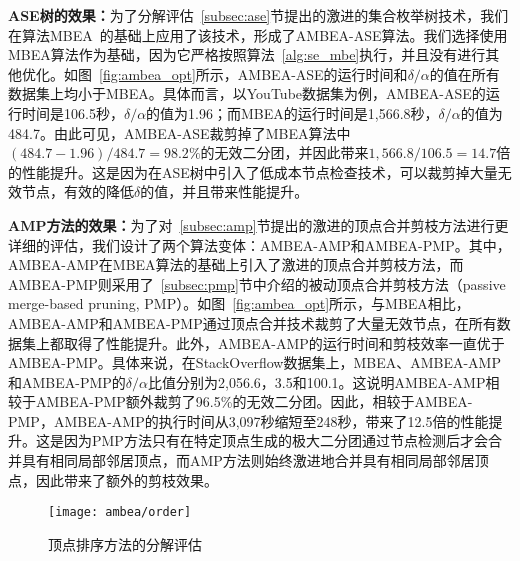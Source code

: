 

\textbf{ASE树的效果：}为了分解评估~\ref{subsec:ase}节提出的激进的集合枚举树技术，我们在算法MBEA~\cite{iMBEA14}的基础上应用了该技术，形成了AMBEA-ASE算法。我们选择使用MBEA算法作为基础，因为它严格按照算法~\ref{alg:se_mbe}执行，并且没有进行其他优化。如图~\ref{fig:ambea_opt}所示，AMBEA-ASE的运行时间和$\delta/\alpha$的值在所有数据集上均小于MBEA。具体而言，以YouTube数据集为例，AMBEA-ASE的运行时间是106.5秒，$\delta/\alpha$的值为1.96；而MBEA的运行时间是1,566.8秒，$\delta/\alpha$的值为484.7。由此可见，AMBEA-ASE裁剪掉了MBEA算法中$(484.7-1.96)/484.7=98.2\%$的无效二分团，并因此带来$1,566.8/106.5=14.7$倍的性能提升。这是因为在ASE树中引入了低成本节点检查技术，可以裁剪掉大量无效节点，有效的降低$\delta$的值，并且带来性能提升。

\textbf{AMP方法的效果：}为了对~\ref{subsec:amp}节提出的激进的顶点合并剪枝方法进行更详细的评估，我们设计了两个算法变体：AMBEA-AMP和AMBEA-PMP。其中，AMBEA-AMP在MBEA算法的基础上引入了激进的顶点合并剪枝方法，而AMBEA-PMP则采用了~\ref{subsec:pmp}节中介绍的被动顶点合并剪枝方法（passive merge-based pruning, PMP）。如图~\ref{fig:ambea_opt}所示，与MBEA相比，AMBEA-AMP和AMBEA-PMP通过顶点合并技术裁剪了大量无效节点，在所有数据集上都取得了性能提升。此外，AMBEA-AMP的运行时间和剪枝效率一直优于AMBEA-PMP。具体来说，在StackOverflow数据集上，MBEA、AMBEA-AMP和AMBEA-PMP的$\delta/\alpha$比值分别为2,056.6，3.5和100.1。这说明AMBEA-AMP相较于AMBEA-PMP额外裁剪了96.5\%的无效二分团。因此，相较于AMBEA-PMP，AMBEA-AMP的执行时间从3,097秒缩短至248秒，带来了12.5倍的性能提升。这是因为PMP方法只有在特定顶点生成的极大二分团通过节点检测后才会合并具有相同局部邻居顶点，而AMP方法则始终激进地合并具有相同局部邻居顶点，因此带来了额外的剪枝效果。

\begin{figure} [H]
	\centering

		\texttt{[image: ambea/order]}


	\caption{顶点排序方法的分解评估}
	\label{fig:ambea_opt_order}
\end{figure}

